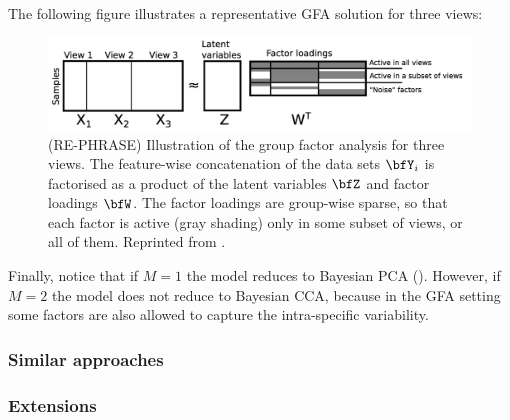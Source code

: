 The following figure illustrates a representative GFA solution for three views:
\begin{figure}[h]
	\centering
	\includegraphics[width=1.0\linewidth]{GFA}
	\caption{(RE-PHRASE) Illustration of the group factor analysis for three views. The feature-wise concatenation of the data sets $\bfY_i$ is factorised as a product of the latent variables $\bfZ$ and factor loadings $\bfW$. The factor loadings are group-wise sparse, so that each factor is active (gray shading) only in some subset of views, or all of them. Reprinted from \cite{bayesian_gfa}.}
	\label{fig:intro:gfa}
\end{figure}

Finally, notice that if $M=1$ the model reduces to Bayesian PCA (). However, if $M=2$ the model does not reduce to Bayesian CCA, because in the GFA setting some factors are also allowed to capture the intra-specific variability.

\subsubsection{Similar approaches}

\subsubsection{Extensions}

